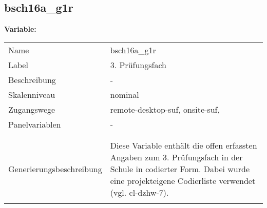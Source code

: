 	
	
	\subsection{bsch16a\_g1r}
	\label{subSection:bsch16a_g1r}

	\noindent\textbf{Variable:}\\
		\begin{tabular}{lL{11.3cm}}
			\label{tableVariable:bsch16a_g1r}
			Name & bsch16a\_g1r \\
			Label & 3. Prüfungsfach \\
			Beschreibung & - \\
			Skalenniveau & nominal \\
			Zugangswege &
				remote-desktop-suf,
				onsite-suf,
 \\
			Panelvariablen & -
			 \\
			 \\
 \\
					Generierungsbeschreibung & Diese Variable enthält die offen erfassten Angaben zum 3. Prüfungsfach in der Schule in codierter Form. Dabei wurde eine projekteigene Codierliste verwendet (vgl. cl-dzhw-7).
				 \\	
			 \\
		\end{tabular}






